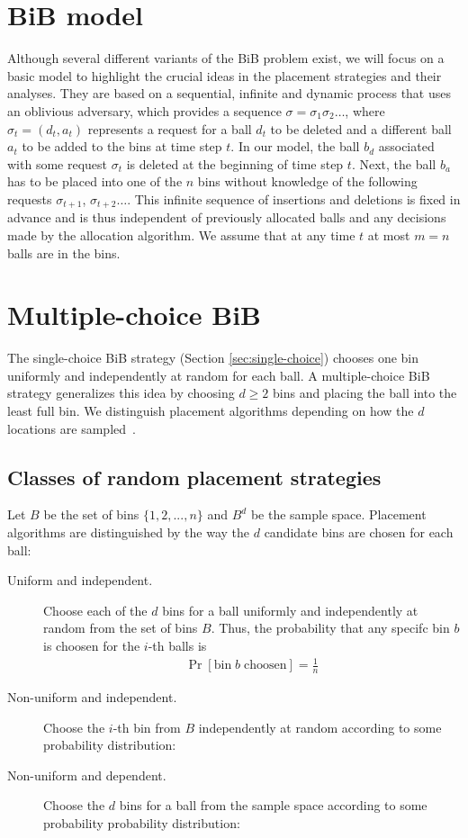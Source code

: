 \documentclass[a4paper,12pt]{article}
\begin{document}
\section{BiB model}
\label{sec:model}
Although several different variants of the BiB problem exist, we will focus on a basic model to highlight the crucial ideas in the placement strategies and their analyses. They are based on a sequential, infinite and dynamic process that uses an oblivious adversary, which provides a sequence $\sigma = \sigma_1 \sigma_2 \dots$, where $\sigma_t = (d_t, a_t)$ represents a request for a ball $d_t$ to be deleted and a different ball $a_t$ to be added to the bins at time step $t$. In our model, the ball $b_d$ associated with some request $\sigma_t$ is deleted at the beginning of time step $t$. Next, the ball $b_a$ has to be placed into one of the $n$ bins without knowledge of the following requests $\sigma_{t+1}$, $\sigma_{t+2}\dots$. This infinite sequence of insertions and deletions is fixed in advance and is thus independent of previously allocated balls and any decisions made by the allocation algorithm. We assume that at any time $t$ at most $m = n$ balls are in the bins.

\section{Multiple-choice BiB}
\label{sec:multiple-choice}
The single-choice BiB strategy (Section \ref{sec:single-choice}) chooses one bin uniformly and independently at random for each ball. A multiple-choice BiB strategy generalizes this idea by  choosing $d \geq 2$ bins and placing the ball into the least full bin. We distinguish placement algorithms depending on how the $d$ locations are sampled~\cite{VOC03}. 

\subsection{Classes of random placement strategies}
\label{sec:classesOfPlacement}
Let $B$ be the set of bins $\{1,2,...,n\}$ and $B^{d}$ be the sample space. Placement algorithms are distinguished by the way the $d$ candidate bins are chosen for each ball:
\begin{description}
\item [Uniform and independent.] Choose each of the $d$ bins for a ball uniformly and independently at random from the set of bins $B$. Thus, the probability that any specifc bin $b$ is choosen for the $i$-th balls is
\begin{align*}
\Pr[\mathrm{bin}\;b\;\mathrm{choosen}] = \frac{1}{n}
\end{align*}
\item [Non-uniform and independent.] Choose the $i$-th bin from $B$ independently at random according to some probability distribution: 
\item [Non-uniform and dependent.] Choose the $d$ bins for a ball from the sample space according to some probability probability distribution:
\end{description}
 
\end{document}
